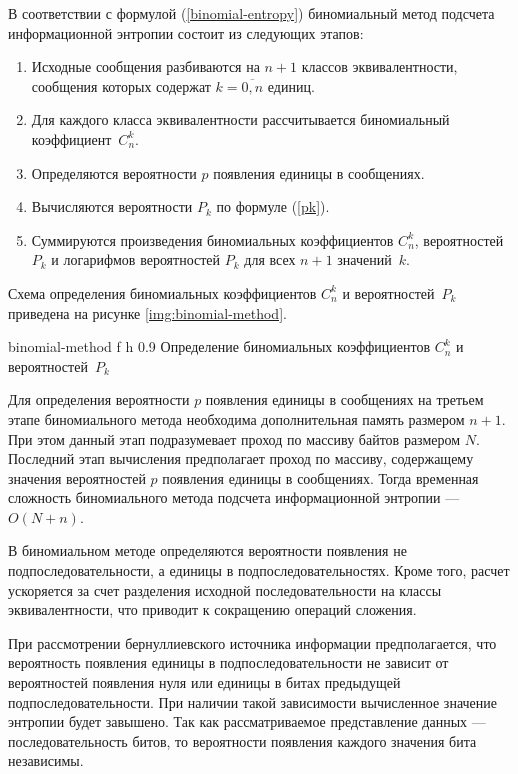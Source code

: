 В соответствии с формулой (\ref{binomial-entropy}) биномиальный метод подсчета информационной энтропии состоит из следующих этапов:

\begin{enumerate}
	\item Исходные сообщения разбиваются на $n + 1$ классов эквивалентности, сообщения которых содержат $k = \overline{0, n}$ единиц.
	\item Для каждого класса эквивалентности рассчитывается биномиальный коэффициент~$C_{n}^k$.
	\item Определяются вероятности $p$ появления единицы в сообщениях.
	\item Вычисляются вероятности $P_{k}$ по формуле (\ref{pk}).
	\item Суммируются произведения биномиальных коэффициентов $C_{n}^k$, вероятностей $P_{k}$ и логарифмов вероятностей $P_{k}$ для всех $n + 1$ значений~$k$.
\end{enumerate}

Схема определения биномиальных коэффициентов $C_{n}^k$ и вероятностей~$P_{k}$ приведена на рисунке \ref{img:binomial-method}.

    {binomial-method}
    {f}
    {h}
    {0.9\textwidth}
    {Определение биномиальных коэффициентов $C_{n}^k$ и вероятностей~$P_{k}$}

Для определения вероятности $p$ появления единицы в сообщениях на третьем этапе биномиального метода необходима дополнительная память размером $n + 1$. При этом данный этап подразумевает проход по массиву байтов размером $N$. Последний этап вычисления предполагает проход по массиву, содержащему значения вероятностей $p$ появления единицы в сообщениях. Тогда временная сложность биномиального метода подсчета информационной энтропии --- $O(N + n)$.

В биномиальном методе определяются вероятности появления не подпоследовательности, а единицы в подпоследовательностях. Кроме того, расчет ускоряется за счет разделения исходной последовательности на классы эквивалентности, что приводит к сокращению операций сложения.

При рассмотрении бернуллиевского источника информации предполагается, что вероятность появления единицы в подпоследовательности не зависит от вероятностей появления нуля или единицы в битах предыдущей подпоследовательности. При наличии такой зависимости вычисленное значение энтропии будет завышено. Так как рассматриваемое представление данных --- последовательность битов, то вероятности появления каждого значения бита независимы. 

